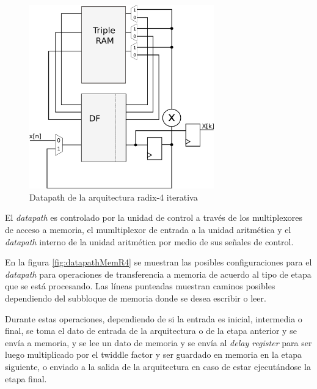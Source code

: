 \begin{figure}[htb!]
        \centering
        \includegraphics[width=8cm]{./figures/datapathR4.png}
        \caption{Datapath de la arquitectura radix-4 iterativa}
        \label{fig:datapathR4}
\end{figure}

El \textit{datapath} es controlado por la unidad de control a través de los multiplexores de acceso
a memoria, el mumltiplexor de entrada a la unidad aritmética y el \textit{datapath} interno de la
unidad aritmética por medio de sus señales de control.

En la figura \ref{fig:datapathMemR4} se muestran las posibles configuraciones para el
\textit{datapath} para operaciones de transferencia a memoria de acuerdo al tipo de etapa que se
está procesando.
Las líneas punteadas muestran caminos posibles dependiendo del subbloque de memoria donde se desea escribir o leer.

Durante estas operaciones, dependiendo de si la entrada es inicial, intermedia o final, se toma el
dato de entrada de la arquitectura o de la etapa anterior y se envía a memoria, y se lee un dato de
memoria y se envía al \textit{delay register} para ser luego multiplicado por el twiddle factor y
ser guardado en memoria en la etapa siguiente, o enviado a la salida de la arquitectura en caso
de estar ejecutándose la etapa final.\\

